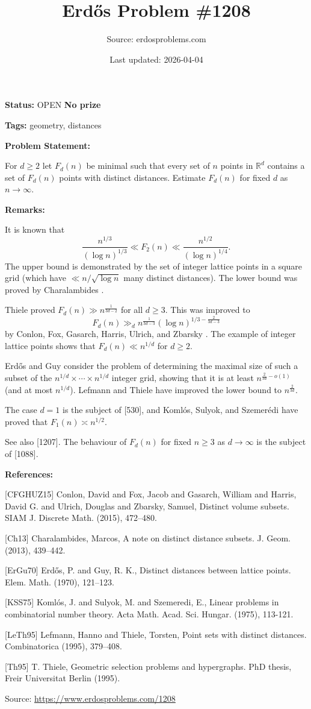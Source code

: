 \documentclass{article}
\title{Erd\H{o}s Problem \#1208}
\date{Last updated: 2026-04-04}
\author{Source: erdosproblems.com}
\begin{document}
\maketitle

\noindent\textbf{Status:} OPEN \quad \textbf{No prize}

\noindent\textbf{Tags:} geometry, distances

\medskip
\noindent\textbf{Problem Statement:}

For $d\geq 2$ let $F_d(n)$ be minimal such that every set of $n$ points in $\mathbb{R}^d$ contains a set of $F_d(n)$ points with distinct distances. Estimate $F_d(n)$ for fixed $d$ as $n\to \infty$.

\bigskip
\noindent\textbf{Remarks:}

It is known that\[\frac{n^{1/3}}{(\log n)^{1/3}}\ll F_2(n) \ll \frac{n^{1/2}}{(\log n)^{1/4}}.\]The upper bound is demonstrated by the set of integer lattice points in a square grid (which have $\ll n/\sqrt{\log n}$ many distinct distances). The lower bound was proved by Charalambides \cite{Ch13}.

Thiele \cite{Th95} proved $F_d(n) \gg n^{\frac{1}{3d-2}}$ for all $d\geq 3$. This was improved to\[F_d(n) \gg_d n^{\frac{1}{3d-3}}(\log n)^{1/3-\frac{2}{3d-3}}\]by Conlon, Fox, Gasarch, Harris, Ulrich, and Zbarsky \cite{CFGHUZ15}. The example of integer lattice points shows that $F_d(n)\ll n^{1/d}$ for $d\geq 2$.

Erd\H{o}s and Guy \cite{ErGu70} consider the problem of determining the maximal size of such a subset of the $n^{1/d}\times\cdots \times n^{1/d}$ integer grid, showing that it is at least $n^{\frac{2}{3d}-o(1)}$ (and at most $n^{1/d}$). Lefmann and Thiele \cite{LeTh95} have improved the lower bound to $n^{\frac{2}{3d}}$.

The case $d=1$ is the subject of [530], and Koml\'{o}s, Sulyok, and Szemer\'{e}di \cite{KSS75} have proved that $F_1(n)\asymp n^{1/2}$.

See also [1207]. The behaviour of $F_d(n)$ for fixed $n\geq 3$ as $d\to \infty$ is the subject of [1088].

\bigskip
\noindent\textbf{References:}

[CFGHUZ15] Conlon, David and Fox, Jacob and Gasarch, William and Harris,
David G. and Ulrich, Douglas and Zbarsky, Samuel, Distinct volume subsets. SIAM J. Discrete Math. (2015), 472--480.
 
 [Ch13] Charalambides, Marcos, A note on distinct distance subsets. J. Geom. (2013), 439--442.
 
 [ErGu70] Erd\H{o}s, P. and Guy, R. K., Distinct distances between lattice points. Elem. Math. (1970), 121--123.
 
 [KSS75] Koml\'{o}s, J. and Sulyok, M. and Szemeredi, E., Linear problems in combinatorial number theory. Acta Math. Acad. Sci. Hungar. (1975), 113-121.
 
 [LeTh95] Lefmann, Hanno and Thiele, Torsten, Point sets with distinct distances. Combinatorica (1995), 379--408.
 
 [Th95] T. Thiele, Geometric selection problems and hypergraphs. PhD thesis, Freir Universitat Berlin (1995).

\bigskip
\noindent\small{Source: \url{https://www.erdosproblems.com/1208}}
\end{document}
